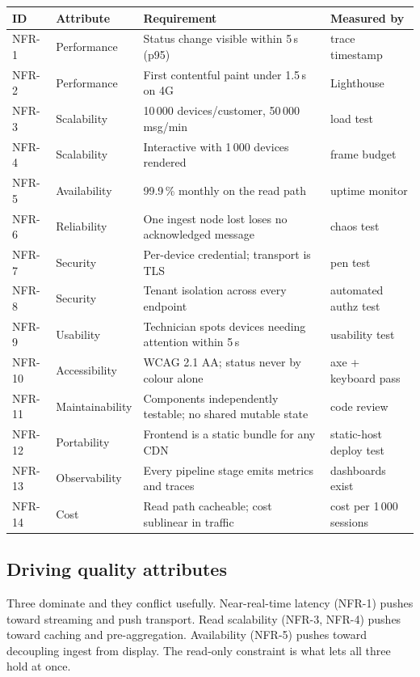 \documentclass[11pt,a4paper]{article}
\begin{document}
\begin{center}
\small
\begin{tabularx}{\textwidth}{@{}l l X l@{}}
\toprule
\textbf{ID} & \textbf{Attribute} & \textbf{Requirement} & \textbf{Measured by} \\
\midrule
NFR-1  & Performance     & Status change visible within 5\,s (p95) & trace timestamp \\
NFR-2  & Performance     & First contentful paint under 1.5\,s on 4G & Lighthouse \\
NFR-3  & Scalability     & 10\,000 devices/customer, 50\,000 msg/min & load test \\
NFR-4  & Scalability     & Interactive with 1\,000 devices rendered & frame budget \\
NFR-5  & Availability    & 99.9\,\% monthly on the read path & uptime monitor \\
NFR-6  & Reliability     & One ingest node lost loses no acknowledged message & chaos test \\
NFR-7  & Security        & Per-device credential; transport is TLS & pen test \\
NFR-8  & Security        & Tenant isolation across every endpoint & automated authz test \\
NFR-9  & Usability       & Technician spots devices needing attention within 5\,s & usability test \\
NFR-10 & Accessibility   & WCAG 2.1 AA; status never by colour alone & axe + keyboard pass \\
NFR-11 & Maintainability & Components independently testable; no shared mutable state & code review \\
NFR-12 & Portability     & Frontend is a static bundle for any CDN & static-host deploy test \\
NFR-13 & Observability   & Every pipeline stage emits metrics and traces & dashboards exist \\
NFR-14 & Cost            & Read path cacheable; cost sublinear in traffic & cost per 1\,000 sessions \\
\bottomrule
\end{tabularx}
\end{center}

\subsection*{Driving quality attributes}

Three dominate and they conflict usefully. Near-real-time latency (NFR-1) pushes
toward streaming and push transport. Read scalability (NFR-3, NFR-4) pushes toward
caching and pre-aggregation. Availability (NFR-5) pushes toward decoupling ingest
from display. The read-only constraint is what lets all three hold at once.
\end{document}
